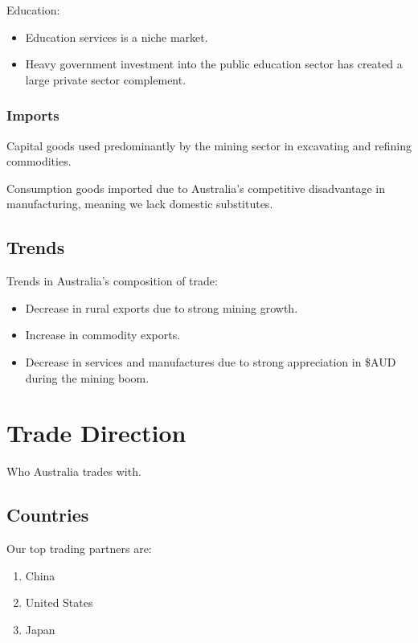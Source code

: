 \documentclass[a4paper,11pt]{article}
\begin{document}
Education:

\begin{itemize}
\item Education services is a niche market.
\item Heavy government investment into the public education sector has created
 	a large private sector complement.
\end{itemize}


\subsubsection{Imports}

Capital goods used predominantly by the mining sector in excavating and
refining commodities.

Consumption goods imported due to Australia's competitive disadvantage in
manufacturing, meaning we lack domestic substitutes.


\subsection{Trends}

Trends in Australia's composition of trade:

\begin{itemize}
\item Decrease in rural exports due to strong mining growth.
\item Increase in commodity exports.
\item Decrease in services and manufactures due to strong appreciation in \$AUD
	during the mining boom.
\end{itemize}




\section{Trade Direction}

Who Australia trades with.


\subsection{Countries}

Our top trading partners are:

\begin{enumerate}
\item China
\item United States
\item Japan
\end{enumerate}
\end{document}
